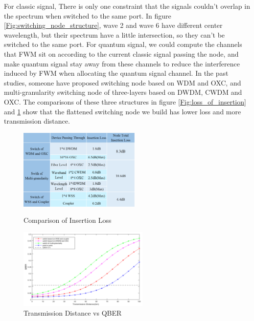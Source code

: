 \documentclass[letterpaper,10pt]{article}
\begin{document}
For classic signal, There is only one constraint that the signals couldn't overlap in the spectrum when switched to the same port. In figure \ref{Fig:switching_node_structure}, wave 2 and wave 6 have different center wavelength, but their spectrum have a little intersection, so they can't be switched to the same port. For quantum signal, we could compute the channels that FWM sit on according to the current classic signal passing the node, and make quantum signal stay away from these channels to reduce the interference induced by FWM when allocating the quantum signal channel. In the past studies, someone have proposed switching node based on WDM and OXC, and multi-granularity switching node of three-layers based on DWDM, CWDM and OXC. The comparisons of these three structures in figure \ref{Fig:loss_of_insertion} and \ref{Fig:distance_vs_qber} show that the flattened switching node we build has lower loss and more transmission distance.

\begin{figure}[!htb]
   \begin{minipage}{0.48\textwidth}
     \centering
     \includegraphics[height= 4cm,width=.9\linewidth]{comparison_of_three_kind_of_nodes_prety}
     \caption{Comparison of Insertion Loss} 
     \label{Fig:loss_of_insertion}
   \end{minipage}\hfill
   \begin{minipage}{0.48\textwidth}
     \centering
     \includegraphics[height= 4cm,width=.9\linewidth]{transmission_distance_vs_QBER_of_three_nodes_3}
     \caption{Transmission Distance vs QBER} 
     \label{Fig:distance_vs_qber}
   \end{minipage}
\end{figure}
\end{document}
